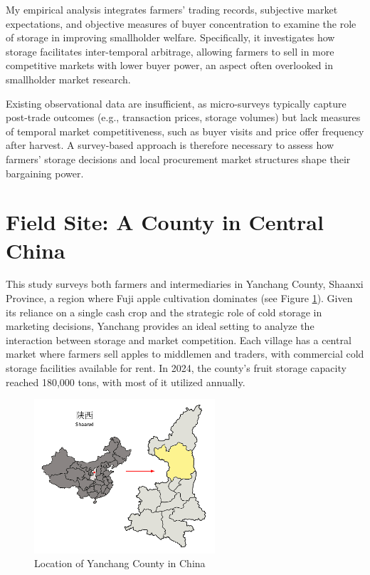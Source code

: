 \noindent My empirical analysis integrates farmers' trading records, subjective market expectations, and objective measures of buyer concentration to examine the role of storage in improving smallholder welfare. Specifically, it investigates how storage facilitates inter-temporal arbitrage, allowing farmers to sell in more competitive markets with lower buyer power, an aspect often overlooked in smallholder market research.  

Existing observational data are insufficient, as micro-surveys typically capture post-trade outcomes (e.g., transaction prices, storage volumes) but lack measures of temporal market competitiveness, such as buyer visits and price offer frequency after harvest. A survey-based approach is therefore necessary to assess how farmers' storage decisions and local procurement market structures shape their bargaining power.  

\section{Field Site: A County in Central China}
\noindent This study surveys both farmers and intermediaries in Yanchang County, Shaanxi Province, a region where Fuji apple cultivation dominates (see Figure \ref{Figure: Yanchang}). Given its reliance on a single cash crop and the strategic role of cold storage in marketing decisions, Yanchang provides an ideal setting to analyze the interaction between storage and market competition. Each village has a central market where farmers sell apples to middlemen and traders, with commercial cold storage facilities available for rent. In 2024, the county's fruit storage capacity reached 180,000 tons, with most of it utilized annually.  

\begin{figure}[thp]
\centering
\includegraphics[width=0.6\textwidth]{figures/yanchang_map.png}
\caption{Location of Yanchang County in China}
\label{Figure: Yanchang}
\end{figure}

